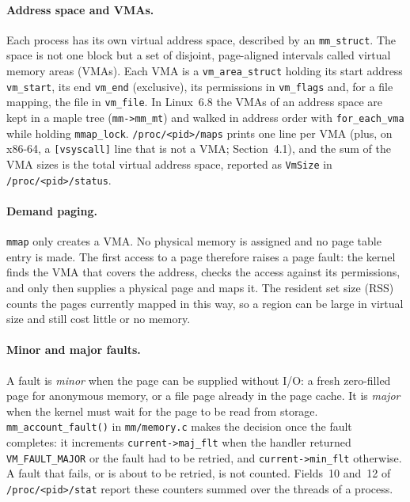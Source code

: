 \paragraph{Address space and VMAs.}
Each process has its own virtual address space, described by an
\texttt{mm\_struct}. The space is not one block but a set of disjoint,
page-aligned intervals called virtual memory areas (VMAs). Each VMA is a
\texttt{vm\_area\_struct} holding its start address \texttt{vm\_start}, its
end \texttt{vm\_end} (exclusive), its permissions in \texttt{vm\_flags} and,
for a file mapping, the file in \texttt{vm\_file}. In Linux~6.8 the VMAs of an
address space are kept in a maple tree (\texttt{mm->mm\_mt}) and walked in
address order with \texttt{for\_each\_vma} while holding \texttt{mmap\_lock}.
\texttt{/proc/<pid>/maps} prints one line per VMA (plus, on x86-64, a
\texttt{[vsyscall]} line that is not a VMA; Section~4.1), and the sum of the VMA sizes
is the total virtual address space, reported as \texttt{VmSize} in
\texttt{/proc/<pid>/status}.

\paragraph{Demand paging.}
\texttt{mmap} only creates a VMA. No physical memory is assigned and no page
table entry is made. The first access to a page therefore raises a page
fault: the kernel finds the VMA that covers the address, checks the access
against its permissions, and only then supplies a physical page and maps it.
The resident set size (RSS) counts the pages currently mapped in this way, so
a region can be large in virtual size and still cost little or no memory.

\paragraph{Minor and major faults.}
A fault is \emph{minor} when the page can be supplied without I/O: a fresh
zero-filled page for anonymous memory, or a file page already in the page
cache. It is \emph{major} when the kernel must wait for the page to be read
from storage. \texttt{mm\_account\_fault()} in \texttt{mm/memory.c} makes the
decision once the fault completes: it increments \texttt{current->maj\_flt}
when the handler returned \texttt{VM\_FAULT\_MAJOR} or the fault had to be
retried, and \texttt{current->min\_flt} otherwise. A fault that fails, or is
about to be retried, is not counted. Fields~10 and~12 of
\texttt{/proc/<pid>/stat} report these counters summed over the threads of a
process.

